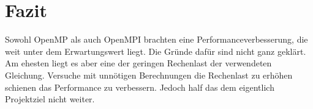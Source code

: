 
\section{Fazit}
Sowohl OpenMP als auch OpenMPI brachten eine Performanceverbesserung, die weit unter dem Erwartungswert liegt. Die Gründe dafür sind nicht ganz geklärt. Am ehesten liegt es aber eine der geringen Rechenlast der verwendeten Gleichung. Versuche mit unnötigen Berechnungen die Rechenlast zu erhöhen schienen das Performance zu verbessern. Jedoch half das dem eigentlich Projektziel nicht weiter.
